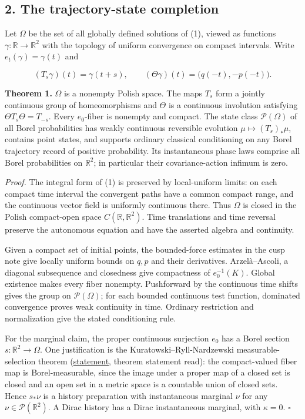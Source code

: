 \documentclass[11pt,a4paper]{article}
\begin{document}
\hypertarget{the-trajectory-state-completion}{%
\subsection{2. The trajectory-state
completion}\label{the-trajectory-state-completion}}

Let \(\Omega\) be the set of all globally defined solutions of (1),
viewed as functions \(\gamma:\mathbb R\to\mathbb R^2\) with the topology
of uniform convergence on compact intervals. Write
\(e_t(\gamma)=\gamma(t)\) and

\[
 (T_s\gamma)(t)=\gamma(t+s),\qquad
 (\Theta\gamma)(t)=\bigl(q(-t),-p(-t)\bigr). \tag{4}
\]

\textbf{Theorem 1.} \(\Omega\) is a nonempty Polish space. The maps
\(T_s\) form a jointly continuous group of homeomorphisms and \(\Theta\)
is a continuous involution satisfying \(\Theta T_s\Theta=T_{-s}\). Every
\(e_0\)-fiber is nonempty and compact. The state class
\(\mathcal P(\Omega)\) of all Borel probabilities has weakly continuous
reversible evolution \(\mu\mapsto(T_s)_*\mu\), contains point states,
and supports ordinary classical conditioning on any Borel trajectory
record of positive probability. Its instantaneous phase laws comprise
all Borel probabilities on \(\mathbb R^2\); in particular their
covariance-action infimum is zero.

\emph{Proof.} The integral form of (1) is preserved by local-uniform
limits: on each compact time interval the convergent paths have a common
compact range, and the continuous vector field is uniformly continuous
there. Thus \(\Omega\) is closed in the Polish compact-open space
\(C(\mathbb R,\mathbb R^2)\). Time translations and time reversal
preserve the autonomous equation and have the asserted algebra and
continuity.

Given a compact set of initial points, the bounded-force estimates in
the cusp note give locally uniform bounds on \(q,p\) and their
derivatives. Arzelà--Ascoli, a diagonal subsequence and closedness give
compactness of \(e_0^{-1}(K)\). Global existence makes every fiber
nonempty. Pushforward by the continuous time shifts gives the group on
\(\mathcal P(\Omega)\); for each bounded continuous test function,
dominated convergence proves weak continuity in time. Ordinary
restriction and normalization give the stated conditioning rule.

For the marginal claim, the proper continuous surjection \(e_0\) has a
Borel section \(s:\mathbb R^2\to\Omega\). One justification is the
Kuratowski--Ryll-Nardzewski measurable-selection theorem
(\href{https://www.cambridge.org/core/services/aop-cambridge-core/content/view/30345D24D3DFFAAF9CE805C30EE959C6/S0008414X00041699a.pdf/some_selection_theorems_for_measurable_functions.pdf}{statement},
theorem statement read): the compact-valued fiber map is
Borel-measurable, since the image under a proper map of a closed set is
closed and an open set in a metric space is a countable union of closed
sets. Hence \(s_*\nu\) is a history preparation with instantaneous
marginal \(\nu\) for any \(\nu\in\mathcal P(\mathbb R^2)\). A Dirac
history has a Dirac instantaneous marginal, with \(\kappa=0\).
\(\square\)
\end{document}
